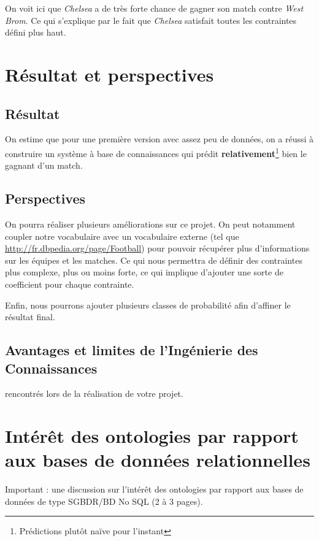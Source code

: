 \documentclass[oneside,13pt,a4paper]{article}
\begin{document}
On voit ici que \textit{Chelsea} a de très forte chance de gagner son match contre \textit{West Brom}.
Ce qui s'explique par le fait que \textit{Chelsea} satisfait toutes les contraintes défini plus haut.

\section{Résultat et perspectives}

\subsection{Résultat}

On estime que pour une première version avec assez peu de données, on a réussi à construire un système à base de connaissances qui prédit \textbf{relativement}\footnote{Prédictions plutôt naïve pour l'instant} bien le gagnant d'un match.

\subsection{Perspectives}

On pourra réaliser plusieurs améliorations sur ce projet. On peut notamment coupler notre vocabulaire avec un vocabulaire externe (tel que \url{http://fr.dbpedia.org/page/Football}) pour pouvoir récupérer plus d’informations sur les équipes et les matches. Ce qui nous permettra de définir des contraintes plus complexe, plus ou moins forte, ce qui implique d’ajouter une sorte de coefficient pour chaque contrainte.

Enfin, nous pourrons ajouter plusieurs classes de probabilité afin d'affiner le résultat final.

\subsection{Avantages et limites de l’Ingénierie des Connaissances}

rencontrés lors de la réalisation de votre projet.

\section{Intérêt des ontologies par rapport aux bases de données relationnelles}

Important : une discussion sur l’intérêt des ontologies par rapport aux bases de données de
type SGBDR/BD No SQL (2 à 3 pages).
\end{document}
